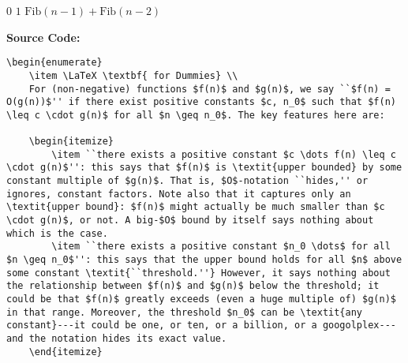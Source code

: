 \documentclass{article}
\begin{document}
\begin{enumerate}
\begin{enumerate}
        \begin{minipage}{\linewidth}
        \begin{algorithm}[H]
            \begin{algorithmic}[1]
                        \State \Return $0$
                    \EndIf
                        \State \Return $1$
                    \EndIf
                    \State \Return $\text{Fib}(n-1) + \text{Fib}(n-2)$
                \EndFunction
            \end{algorithmic}
        \end{algorithm}
        \end{minipage}
    \end{enumerate}

    \textbf{Source Code:}
    \begin{verbatim}
\begin{enumerate}
    \item \LaTeX \textbf{ for Dummies} \\
    For (non-negative) functions $f(n)$ and $g(n)$, we say ``$f(n) = O(g(n))$'' if there exist positive constants $c, n_0$ such that $f(n) \leq c \cdot g(n)$ for all $n \geq n_0$. The key features here are:

    \begin{itemize}
        \item ``there exists a positive constant $c \dots f(n) \leq c \cdot g(n)$'': this says that $f(n)$ is \textit{upper bounded} by some constant multiple of $g(n)$. That is, $O$-notation ``hides,'' or ignores, constant factors. Note also that it captures only an \textit{upper bound}: $f(n)$ might actually be much smaller than $c \cdot g(n)$, or not. A big-$O$ bound by itself says nothing about which is the case.
        \item ``there exists a positive constant $n_0 \dots$ for all $n \geq n_0$'': this says that the upper bound holds for all $n$ above some constant \textit{``threshold.''} However, it says nothing about the relationship between $f(n)$ and $g(n)$ below the threshold; it could be that $f(n)$ greatly exceeds (even a huge multiple of) $g(n)$ in that range. Moreover, the threshold $n_0$ can be \textit{any constant}---it could be one, or ten, or a billion, or a googolplex---and the notation hides its exact value.
    \end{itemize}




\end{verbatim}
\end{enumerate}
\end{document}
